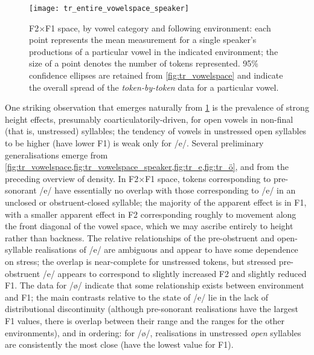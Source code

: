 \begin{figure}[H]
  \centering
  \texttt{[image: tr\_entire\_vowelspace\_speaker]}
  \caption[F2$\times$F1 space, individual speaker means only.]{F2$\times$F1 space, by vowel category and following environment: each point represents the mean measurement for a single speaker's productions of a particular vowel in the indicated environment; the size of a point denotes the number of tokens represented. 95\% confidence ellipses are retained from \cref{fig:tr_vowelspace} and indicate the overall spread of the \emph{token-by-token} data for a particular vowel.}
  \label{fig:tr_vowelspace_speaker}
\end{figure}

One striking observation that emerges naturally from \cref{fig:tr_vowelspace_speaker} is the prevalence of strong height effects, presumably coarticulatorily-driven, for open vowels in non-final (that is, unstressed) syllables; the tendency of vowels in unstressed open syllables to be higher (have lower F1) is weak only for /e/. Several preliminary generalisations emerge from \cref{fig:tr_vowelspace,fig:tr_vowelspace_speaker,fig:tr_e,fig:tr_ö}, and from the preceding overview of density. In F2$\times$F1 space, tokens corresponding to pre-sonorant /e/ have essentially no overlap with those corresponding to /e/ in an unclosed or obstruent-closed syllable; the majority of the apparent effect is in F1, with a smaller apparent effect in F2 corresponding roughly to movement along the front diagonal of the vowel space, which we may ascribe entirely to height rather than backness. The relative relationships of the pre-obstruent and open-syllable realisations of /e/ are ambiguous and appear to have some dependence on stress; the overlap is near-complete for unstressed tokens, but stressed pre-obstruent /e/ appears to correspond to slightly increased F2 and slightly reduced F1. The data for /\o/ indicate that some relationship exists between environment and F1; the main contrasts relative to the state of /e/ lie in the lack of distributional discontinuity (although pre-sonorant realisations have the largest F1 values, there is overlap between their range and the ranges for the other environments), and in ordering: for /\o/, realisations in unstressed \emph{open} syllables are consistently the most close (have the lowest value for F1).

%

